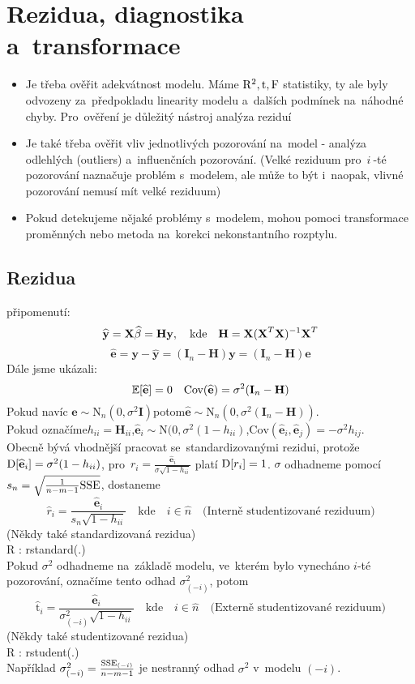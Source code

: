 \chapter{Rezidua, diagnostika a~transformace}
\begin{itemize}
 \item Je třeba ověřit adekvátnost modelu. Máme $\mathrm{R}^2, \mathrm{t}, \text{F}$ statistiky, ty ale byly odvozeny za~předpokladu linearity modelu a~dalších podmínek na~náhodné chyby. Pro~ověření je důležitý nástroj analýza reziduí
 \item Je také třeba ověřit vliv jednotlivých pozorování na~model - analýza odlehlých (outliers) a~influenčních pozorování. (Velké reziduum pro~$i~$-té pozorování naznačuje problém s~modelem, ale může to být i~naopak, vlivné pozorování nemusí mít velké reziduum)
 \item Pokud detekujeme nějaké problémy s~modelem, mohou pomoci transformace proměnných nebo metoda na~korekci nekonstantního rozptylu.
\end{itemize}
\section{Rezidua}
připomenutí:
 $$
 \widehat{\textbf{y}} = \textbf{X} \widehat{\beta} = \textbf{Hy}, \quad \text{kde} \quad \textbf{H} = \textbf{X} (\textbf{X}^T \textbf{X})^{-1} \textbf{X}^T
 $$
 $$
 \widehat{\textbf{e}} = \textbf{y} - \widehat{\textbf{y}} = (\textbf{I}_n - \textbf{H}) \textbf{y} = (\textbf{I}_n - \textbf{H}) \textbf{e}
 $$
Dále jsme ukázali:
 $$
\mathbb{E} [\widehat{\textbf{e}}] = 0 \quad \text{Cov}(\widehat{\textbf{e}}) = \sigma^2 (\textbf{I}_n - \textbf{H})
 $$
Pokud navíc
 $
\textbf{e} \sim \text{N}_n (0,\sigma^2 \textbf{I}) $potom$ \widehat{\textbf{e}} \sim \text{N}_n (0,\sigma^2 (\textbf{I}_n - \textbf{H}))
 $. \\ Pokud označíme$ h_{ii} = \textbf{H}_{ii} $,$ \widehat{\textbf{e}}_i \sim \text{N} (0, \sigma^2 (1 - h_{ii}) $,$ \text{Cov}(\widehat{\textbf{e}}_i, \widehat{\textbf{e}}_j) = -\sigma^2 h_{ij} $. \\
Obecně bývá vhodnější pracovat se~standardizovanými rezidui, protože $\mathrm{D} [\widehat{\textbf{e}}_i] = \sigma^2 (1 - h_{ii})$, pro~$r_i = \frac{\widehat{\textbf{e}}_i}{\sigma \sqrt{1-h_{ii}}}$ platí $\mathrm{D} [r_i] = 1$.
 $\sigma$ odhadneme pomocí $s_n = \sqrt{\frac{1}{n-m-1} \mathrm{SSE}}$, dostaneme
 $$
  \widehat{r}_i = \frac{\widehat{\textbf{e}}_i}{s_n \sqrt{1 - h_{ii}}} \quad \text{kde} \quad i\in\widehat{n} \quad \text{(Interně studentizované reziduum)}
 $$
(Někdy také standardizovaná rezidua) \\
R : rstandard(.) \\
Pokud $\sigma^2$ odhadneme na~základě modelu, ve~kterém bylo vynecháno $i$-té pozorování, označíme tento odhad $\sigma^2_{(-i)}$, potom
 $$
 \widehat{\mathrm{t}}_i = \frac{\widehat{\textbf{e}}_i}{  \sigma^2_{(-i)} \sqrt{1 - h_{ii}}} \quad \text{kde} \quad i\in\widehat{n} \quad \text{(Externě studentizované reziduum)}
 $$
(Někdy také studentizované rezidua) \\
R : rstudent(.) \\
Například $\sigma^2_{(-i)} = \frac{\mathrm{SSE}_{(-i)}}{n-m-1}$ je nestranný odhad $\sigma^2$ v~modelu $(-i)$.

